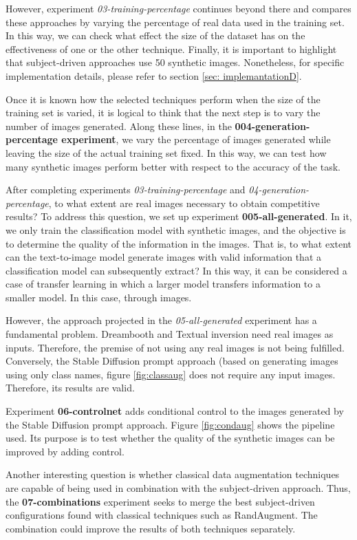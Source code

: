 However, experiment \textit{03-training-percentage} continues beyond there and compares these approaches by varying the percentage of real data used in the training set. In this way, we can check what effect the size of the dataset has on the effectiveness of one or the other technique. Finally, it is important to highlight that subject-driven approaches use 50 synthetic images. Nonetheless, for specific implementation details, please refer to section \ref{sec: implemantationD}.

Once it is known how the selected techniques perform when the size of the training set is varied, it is logical to think that the next step is to vary the number of images generated. Along these lines, in the \textbf{004-generation-percentage experiment}, we vary the percentage of images generated while leaving the size of the actual training set fixed. In this way, we can test how many synthetic images perform better with respect to the accuracy of the task.

After completing experiments \textit{03-training-percentage} and \textit{04-generation-percentage}, to what extent are real images necessary to obtain competitive results? To address this question, we set up experiment \textbf{005-all-generated}. In it, we only train the classification model with synthetic images, and the objective is to determine the quality of the information in the images. That is, to what extent can the text-to-image model generate images with valid information that a classification model can subsequently extract? In this way, it can be considered a case of transfer learning in which a larger model transfers information to a smaller model. In this case, through images.

However, the approach projected in the \textit{05-all-generated} experiment has a fundamental problem. Dreambooth and Textual inversion need real images as inputs. Therefore, the premise of not using any real images is not being fulfilled. Conversely, the Stable Diffusion prompt approach (based on generating images using only class names, figure \ref{fig:classaug} does not require any input images. Therefore, its results are valid.

Experiment \textbf{06-controlnet} adds conditional control to the images generated by the Stable Diffusion prompt approach. Figure \ref{fig:condaug} shows the pipeline used. Its purpose is to test whether the quality of the synthetic images can be improved by adding control.

Another interesting question is whether classical data augmentation techniques are capable of being used in combination with the subject-driven approach. Thus, the \textbf{07-combinations} experiment seeks to merge the best subject-driven configurations found with classical techniques such as RandAugment. The combination could improve the results of both techniques separately. 

